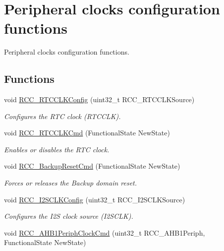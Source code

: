 \hypertarget{group___r_c_c___group3}{\section{Peripheral clocks configuration functions}
\label{group___r_c_c___group3}
}


Peripheral clocks configuration functions.  


\subsection*{Functions}
\begin{DoxyCompactItemize}
\item 
void \hyperlink{group___r_c_c___group3_ga1473d8a5a020642966359611c44181b0}{R\-C\-C\-\_\-\-R\-T\-C\-C\-L\-K\-Config} (uint32\-\_\-t R\-C\-C\-\_\-\-R\-T\-C\-C\-L\-K\-Source)
\begin{DoxyCompactList}\small\item\em Configures the R\-T\-C clock (R\-T\-C\-C\-L\-K). \end{DoxyCompactList}\item 
void \hyperlink{group___r_c_c___group3_ga9802f84846df2cea8e369234ed13b159}{R\-C\-C\-\_\-\-R\-T\-C\-C\-L\-K\-Cmd} (Functional\-State New\-State)
\begin{DoxyCompactList}\small\item\em Enables or disables the R\-T\-C clock. \end{DoxyCompactList}\item 
void \hyperlink{group___r_c_c___group3_ga636c3b72f35391e67f12a551b15fa54a}{R\-C\-C\-\_\-\-Backup\-Reset\-Cmd} (Functional\-State New\-State)
\begin{DoxyCompactList}\small\item\em Forces or releases the Backup domain reset. \end{DoxyCompactList}\item 
void \hyperlink{group___r_c_c___group3_ga6c56f8529988fcc8f4dbffbc1bab27d0}{R\-C\-C\-\_\-\-I2\-S\-C\-L\-K\-Config} (uint32\-\_\-t R\-C\-C\-\_\-\-I2\-S\-C\-L\-K\-Source)
\begin{DoxyCompactList}\small\item\em Configures the I2\-S clock source (I2\-S\-C\-L\-K). \end{DoxyCompactList}\item 
void \hyperlink{group___r_c_c___group3_ga80c89116820d48bb38db2e7d5e5a49b9}{R\-C\-C\-\_\-\-A\-H\-B1\-Periph\-Clock\-Cmd} (uint32\-\_\-t R\-C\-C\-\_\-\-A\-H\-B1\-Periph, Functional\-State New\-State)

\end{DoxyCompactItemize}
